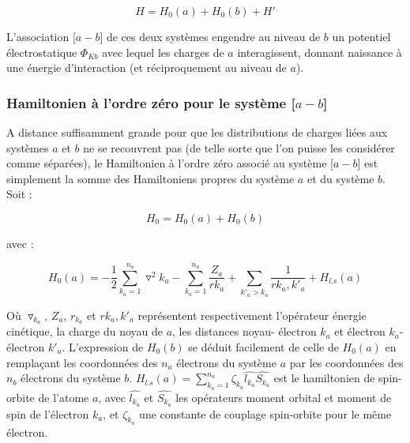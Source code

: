 \documentclass[12pt,a4paper]{book}
\begin{document}
	\begin{equation}
	H = H_{0}(a) + H_{0}(b) + H'
	\end{equation}
	
	L'association [$a-b$] de ces deux systèmes engendre au niveau de $b$ un potentiel électrostatique $\Phi_{Kb}$ avec lequel les charges de $a$ interagissent, donnant naissance à une énergie d'interaction (et réciproquement au niveau de $a$).
	
	\subsubsection{Hamiltonien à l'ordre zéro pour le système [$a-b$]}
	
	A distance suffisamment grande pour que les distributions de charges liées aux systèmes $a$ et $b$ ne se recouvrent pas (de telle sorte que l'on puisse les considérer comme séparées), le Hamiltonien à l'ordre zéro associé au système [$a-b$] est simplement la somme des Hamiltoniens propres du système $a$ et du système $b$. Soit : 
	
	\begin{equation}
	H_{0} = H_{0}(a) + H_{0}(b) \label{1.2}
	\end{equation}
	
	\noindent avec : 
	
	\begin{equation}
	H_{0}(a) = -\frac{1}{2} \sum_{k_{a}=1}^{n_{a}} \triangledown^{2} k_{a} - \sum_{k_{a}=1}^{n_{a}} \frac{Z_{a}}{rk_{a}} + \sum_{k'_{a}>k_{a}} \frac{1}{rk_{a},k'_{a}} + H_{l.s}(a)  \label{1.3}
	\end{equation}
	
	Où $\triangledown_{k_{a}}$, $Z_{a}$, $r_{k_{a}}$ et $rk_{a},k'_{a}$ représentent respectivement l'opérateur énergie cinétique, la charge du noyau de $a$, les distances noyau- électron $k_{a}$ et électron $k_{a}$- électron $k'_{a}$. L'expression de $H_{0}(b)$ se déduit facilement de celle de $H_{0}(a)$ en remplaçant les coordonnées des $n_{a}$ électrons du système $a$ par les coordonnées des $n_{b}$ électrons du système $b$. $H_{l.s}(a)= \sum_{k_{a}=1}^{n_{a}} \zeta_{k_{a}} \widehat{l_{k_{a}}} \widehat{S_{k_{a}}}$ est le hamiltonien de spin-orbite de l'atome $a$, avec $\widehat{l_{k_{a}}}$ et $\widehat{S_{k_{a}}}$ les opérateurs moment orbital et moment de spin de l'électron $k_{a}$, et $\zeta_{k_{a}}$ une constante de couplage spin-orbite pour le même électron.
	
\end{document}
